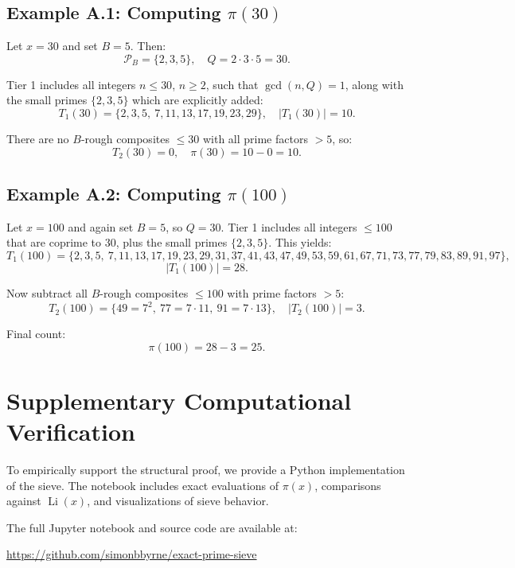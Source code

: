 \documentclass[11pt]{article}
\begin{document}
	\subsection{Example A.1: Computing \( \pi(30) \)}
	
	Let \( x = 30 \) and set \( B = 5 \). Then:
	\[
	\mathcal{P}_B = \{2, 3, 5\}, \quad Q = 2 \cdot 3 \cdot 5 = 30.
	\]
	
	Tier 1 includes all integers \( n \leq 30 \), \( n \geq 2 \), such that \( \gcd(n, Q) = 1 \), along with the small primes \( \{2, 3, 5\} \) which are explicitly added:
	\[
	T_1(30) = \{2, 3, 5,\ 7, 11, 13, 17, 19, 23, 29\}, \quad |T_1(30)| = 10.
	\]
	
	There are no \( B \)-rough composites \( \leq 30 \) with all prime factors \( > 5 \), so:
	\[
	T_2(30) = 0, \quad \pi(30) = 10 - 0 = 10.
	\]
	
	\subsection{Example A.2: Computing \( \pi(100) \)}
	
	Let \( x = 100 \) and again set \( B = 5 \), so \( Q = 30 \). Tier 1 includes all integers \( \leq 100 \) that are coprime to 30, plus the small primes \( \{2, 3, 5\} \). This yields:
	\[
	T_1(100) = \{2, 3, 5,\ 7, 11, 13, 17, 19, 23, 29, 31, 37, 41, 43, 47, 49, 53, 59, 61, 67, 71, 73, 77, 79, 83, 89, 91, 97\},
	\]
	\[
	|T_1(100)| = 28.
	\]
	
	Now subtract all \( B \)-rough composites \( \leq 100 \) with prime factors \( > 5 \):
	\[
	T_2(100) = \{49 = 7^2,\ 77 = 7 \cdot 11,\ 91 = 7 \cdot 13\}, \quad |T_2(100)| = 3.
	\]
	
	Final count:
	\[
	\pi(100) = 28 - 3 = 25.
	\]

	
		
	\section*{Supplementary Computational Verification}
	
	To empirically support the structural proof, we provide a Python implementation of the sieve. The notebook includes exact evaluations of \( \pi(x) \), comparisons against \( \operatorname{Li}(x) \), and visualizations of sieve behavior.
	
	The full Jupyter notebook and source code are available at:
	
	\url{https://github.com/simonbbyrne/exact-prime-sieve}
\end{document}

